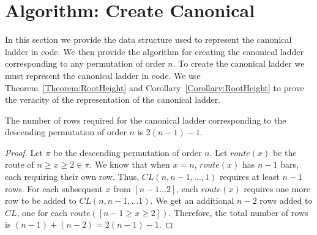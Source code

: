 

\section{Algorithm: Create Canonical}
In this section we provide the data structure used to represent the canonical ladder in code. We then provide the algorithm for creating the canonical ladder corresponding to any permutation of 
order $n$. 
To create the canonical ladder 
we must represent the canonical ladder in code. We use Theorem~\ref{Theorem:RootHeight} and Corollary~\ref{Corollary:RootHeight} to prove the 
veracity of the representation of the canonical ladder.
 \begin{theorem}
   The number of rows required for the canonical ladder corresponding to the descending permutation of order $n$ is $2(n-1) - 1$.
   \label{Theorem:RootHeight}
 \end{theorem}
 \begin{proof}
 	Let $\pi$ be the descending permutation of order $n$. Let $route(x)$ be the route of $n \geq x \geq 2 \in \pi$. We know that 
     when $x=n$, $route(x)$ has $n-1$ bars, each requiring their own row. Thus, $CL(n,n-1, \dots, 1)$ requires at least $n-1$ rows. 
     For each subsequent $x$ from $[n-1 \dots 2]$, each $route(x)$ requires one more row to be added to $CL(n, n-1, \dots 1)$. 
     We get an additional $n-2$ rows added to $CL$, one for each $route([n-1 \geq x \geq 2])$. Therefore, the total number of rows is 
     $(n-1)+(n-2)=2(n-1)-1$.
 \end{proof}

